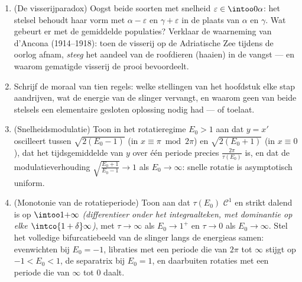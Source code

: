 \begin{problem}
\begin{enumerate}[resume]
        de tijdsgemiddelden zijn gelijk aan de evenwichtswaarden,
        wat de amplitude ook is \emph{(integreer $(\ln x)' =
        \alpha - \beta y$ over één periode)}.
  \item (De visserijparadox) Oogst beide soorten met snelheid
        $\varepsilon \in \intoo0\alpha$: het stelsel behoudt haar
        vorm met $\alpha - \varepsilon$ en $\gamma + \varepsilon$
        in de plaats van $\alpha$ en $\gamma$. Wat gebeurt er met
        de gemiddelde populaties? Verklaar de waarneming van
        d'Ancona (1914--1918): toen de visserij op de Adriatische
        Zee tijdens de oorlog afnam, \emph{steeg} het aandeel van
        de roofdieren (haaien) in de vangst --- en waarom
        gematigde visserij de prooi bevoordeelt.
  \item Schrijf de moraal van tien regels: welke stellingen van
        het hoofdstuk elke stap aandrijven, wat de energie van de
        slinger vervangt, en waarom geen van beide stelsels een
        elementaire gesloten oplossing nodig had --- of toelaat.

  \item (Snelheidsmodulatie) Toon in het rotatieregime $E_0 > 1$
        aan dat $y = x'$ oscilleert tussen $\sqrt{2(E_0 - 1)}$
        (in $x \equiv \pi \bmod 2\pi$) en $\sqrt{2(E_0 + 1)}$ (in
        $x \equiv 0$), dat het tijdsgemiddelde van $y$ over één
        periode precies $\frac{2\pi}{\tau(E_0)}$ is, en dat de
        modulatieverhouding $\sqrt{\frac{E_0 + 1}{E_0 - 1}} \to
        1$ als $E_0 \to \infty$: snelle rotatie is asymptotisch
        uniform.
  \item (Monotonie van de rotatieperiode) Toon aan dat
        $\tau(E_0)$ $\mathcal C^1$ en strikt dalend is op
        $\intoo1{+\infty}$ \emph{(differentieer onder het
        integraalteken, met dominantie op elke $\intco{1 +
        \delta}\infty$)}, met $\tau \to \infty$ als $E_0 \to 1^+$
        en $\tau \to 0$ als $E_0 \to \infty$. Stel het volledige
        bifurcatiebeeld van de slinger langs de energieas samen:
        evenwichten bij $E_0 = -1$, libraties met een periode die
        van $2\pi$ tot $\infty$ stijgt op $-1 < E_0 < 1$, de
        separatrix bij $E_0 = 1$, en daarbuiten rotaties met een
        periode die van $\infty$ tot $0$ daalt.
\end{enumerate}
\end{problem}
